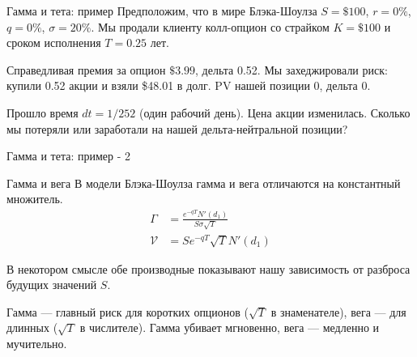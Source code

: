 \documentclass{beamer}
\begin{document}
\begin{frame}{Гамма и тета: пример}
\justify
Предположим, что в мире Блэка-Шоулза $S=\$100$, $r=0\%$, $q=0\%$, $\sigma=20\%$. Мы 
\alert{продали} клиенту колл-опцион со страйком $K=\$100$ и сроком исполнения $T=0.25$ 
лет.

\justify
Справедливая премия за опцион $\$3.99$, дельта 0.52. Мы захеджировали риск: купили
0.52 акции и взяли \$48.01 в долг. PV нашей позиции 0, дельта 0. 

\justify
Прошло время $dt = 1/252$ (один рабочий день). Цена акции изменилась. Сколько мы потеряли или заработали на нашей дельта-нейтральной позиции?
\end{frame}



\begin{frame}{Гамма и тета: пример - 2}
\centering
{}
\end{frame}



\begin{frame}{Гамма и вега}
\justify
В модели Блэка-Шоулза гамма и вега отличаются на константный множитель.
\begin{align*}
\Gamma &= \frac{e^{-qT}N'(d_1)}{S\sigma\sqrt{T}} \\
\mathcal{V} &= Se^{-qT}\sqrt{T}N'(d_1)
\end{align*}

\justify
В некотором смысле обе производные показывают нашу зависимость от разброса будущих значений $S$.

\justify
Гамма --- главный риск для коротких опционов ($\sqrt{T}$ в знаменателе), вега --- для длинных ($\sqrt{T}$ в числителе). Гамма убивает мгновенно, вега --- медленно и мучительно.
\end{frame}
\end{document}
